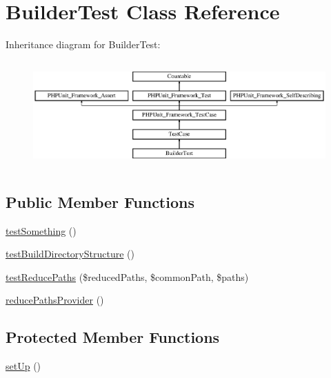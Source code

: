 \hypertarget{class_sebastian_bergmann_1_1_code_coverage_1_1_report_1_1_builder_test}{}\section{Builder\+Test Class Reference}
\label{class_sebastian_bergmann_1_1_code_coverage_1_1_report_1_1_builder_test}
Inheritance diagram for Builder\+Test\+:\begin{figure}[H]
\begin{center}
\leavevmode
\includegraphics[height=4.129793cm]{class_sebastian_bergmann_1_1_code_coverage_1_1_report_1_1_builder_test}
\end{center}
\end{figure}
\subsection*{Public Member Functions}
\begin{DoxyCompactItemize}
\item 
\mbox{\hyperlink{class_sebastian_bergmann_1_1_code_coverage_1_1_report_1_1_builder_test_a0fc4e17369bc9607ebdd850d9eda8167}{test\+Something}} ()
\item 
\mbox{\hyperlink{class_sebastian_bergmann_1_1_code_coverage_1_1_report_1_1_builder_test_abcb02315efb6117708bbb98eac4f4032}{test\+Build\+Directory\+Structure}} ()
\item 
\mbox{\hyperlink{class_sebastian_bergmann_1_1_code_coverage_1_1_report_1_1_builder_test_a025c4bc5157fae31076887c6a1de70ff}{test\+Reduce\+Paths}} (\$reduced\+Paths, \$common\+Path, \$paths)
\item 
\mbox{\hyperlink{class_sebastian_bergmann_1_1_code_coverage_1_1_report_1_1_builder_test_a434707b93f3ac4a893d3e687d3fb5c49}{reduce\+Paths\+Provider}} ()
\end{DoxyCompactItemize}
\subsection*{Protected Member Functions}
\begin{DoxyCompactItemize}
\item 
\mbox{\hyperlink{class_sebastian_bergmann_1_1_code_coverage_1_1_report_1_1_builder_test_a0bc688732d2b3b162ffebaf7812e78da}{set\+Up}} ()
\end{DoxyCompactItemize}
